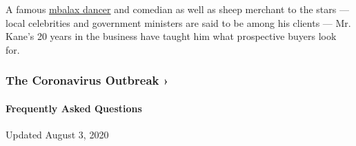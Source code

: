 A famous \href{https://www.youtube.com/watch?v=SfeOEF8zvcs}{mbalax
dancer} and comedian as well as sheep merchant to the stars --- local
celebrities and government ministers are said to be among his clients
--- Mr. Kane's 20 years in the business have taught him what prospective
buyers look for.

\href{https://www.nytimes3xbfgragh.onion/news-event/coronavirus?action=click\&pgtype=Article\&state=default\&region=MAIN_CONTENT_3\&context=storylines_faq}{}

\hypertarget{the-coronavirus-outbreak-}{%
\subsubsection{The Coronavirus Outbreak
›}\label{the-coronavirus-outbreak-}}

\hypertarget{frequently-asked-questions}{%
\paragraph{Frequently Asked
Questions}\label{frequently-asked-questions}}

Updated August 3, 2020

